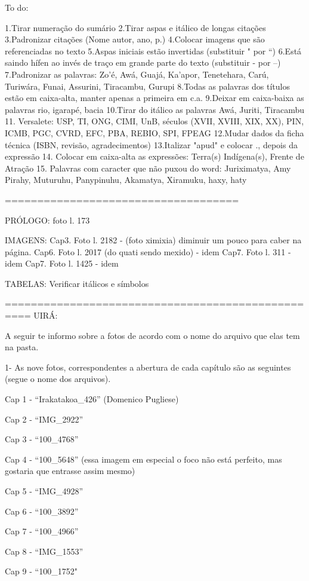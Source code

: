 To do:

1.Tirar numeração do sumário
2.Tirar aspas e itálico de longas citações
3.Padronizar citações (Nome autor, ano, p.)
4.Colocar imagens que são referenciadas no texto
5.Aspas iniciais estão invertidas (substituir " por ``)
6.Está saindo hífen ao invés de traço em grande parte do texto (substituir - por --)
7.Padronizar as palavras: Zo'é, Awá, Guajá, Ka'apor, Tenetehara, Carú, Turiwára, Funai, Assurini, Tiracambu, Gurupi
8.Todas as palavras dos títulos estão em caixa-alta, manter apenas a primeira em c.a.
9.Deixar em caixa-baixa as palavras rio, igarapé, bacia
10.Tirar do itálico as palavras Awá, Juriti, Tiracambu
11. Versalete: USP, TI, ONG, CIMI, UnB, séculos (XVII, XVIII, XIX, XX), PIN, ICMB, PGC, CVRD, EFC, PBA, REBIO, SPI, FPEAG 
12.Mudar dados da ficha técnica (ISBN, revisão, agradecimentos)
13.Italizar "apud" e colocar ., depois da expressão
14. Colocar em caixa-alta as expressões: Terra(s) Indígena(s), Frente de Atração
15. Palavras com caracter que não puxou do word: Juriximatya, Amy Pirahy, Muturuhu, Panypinuhu, Akamatya, Xiramuku, haxy, haty

====================================

PRÓLOGO: foto l. 173
		 
IMAGENS: Cap3. Foto l. 2182 - (foto ximixia) diminuir um pouco para caber na página.
		 Cap6. Foto l. 2017 (do quati sendo mexido) - idem
		 Cap7. Foto l. 311 - idem
		 Cap7. Foto l. 1425 - idem
		 
TABELAS: Verificar itálicos e símbolos

==================================================
UIRÁ:

A seguir te informo sobre a fotos de acordo com o nome do arquivo que elas tem na pasta.

1- As nove fotos, correspondentes a abertura de cada capítulo são as seguintes (segue o nome dos arquivos).

Cap 1 - “Irakatakoa_426” (Domenico Pugliese)

Cap 2 -  “IMG_2922”

Cap 3 - “100_4768”

Cap 4 - “100_5648” (essa imagem em especial o foco não está perfeito, mas gostaria que entrasse assim mesmo)

Cap 5 -  “IMG_4928”

Cap 6 - “100_3892”

Cap 7 - “100_4966”

Cap 8 - “IMG_1553”

Cap 9 - “100_1752"



